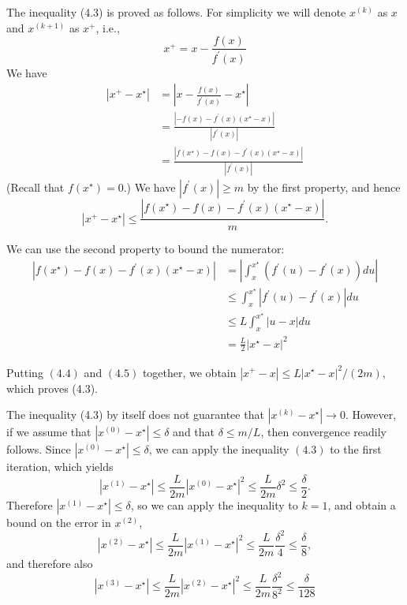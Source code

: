 The inequality (4.3) is proved as follows. For simplicity we will denote $ x^{(k)} $ as $ x $ and $ x^{(k+1)} $ as $ x^{+} $, i.e.,
$$
x^{+}=x-\frac{f(x)}{f^{\prime}(x)}
$$
We have
$$
\begin{aligned}
\left|x^{+}-x^{\star}\right| &=\left|x-\frac{f(x)}{f^{\prime}(x)}-x^{\star}\right| \\
&=\frac{\left|-f(x)-f^{\prime}(x)\left(x^{\star}-x\right)\right|}{\left|f^{\prime}(x)\right|} \\
&=\frac{\left|f\left(x^{\star}\right)-f(x)-f^{\prime}(x)\left(x^{\star}-x\right)\right|}{\left|f^{\prime}(x)\right|}
\end{aligned}
$$
(Recall that $ f\left(x^{\star}\right)=0 $.) We have $ \left|f^{\prime}(x)\right| \geq m $ by the first property, and hence
$$
\left|x^{+}-x^{\star}\right| \leq \frac{\left|f\left(x^{\star}\right)-f(x)-f^{\prime}(x)\left(x^{\star}-x\right)\right|}{m} .
$$

We can use the second property to bound the numerator:
$$
\begin{aligned}
\left|f\left(x^{\star}\right)-f(x)-f^{\prime}(x)\left(x^{\star}-x\right)\right| &=\left|\int_{x}^{x^{\star}}\left(f^{\prime}(u)-f^{\prime}(x)\right) d u\right| \\
& \leq \int_{x}^{x^{\star}}\left|f^{\prime}(u)-f^{\prime}(x)\right| d u \\
& \leq L \int_{x}^{x^{\star}}|u-x| d u \\
&=\frac{L}{2}\left|x^{\star}-x\right|^{2}
\end{aligned}
$$

Putting $ (4.4) $ and $ (4.5) $ together, we obtain $ \left|x^{+}-x\right| \leq L\left|x^{\star}-x\right|^{2} /(2 m) $, which proves (4.3).

The inequality (4.3) by itself does not guarantee that $ \left|x^{(k)}-x^{\star}\right| \rightarrow 0 $. However, if we assume that $ \left|x^{(0)}-x^{\star}\right| \leq \delta $ and that $ \delta \leq m / L $, then convergence readily follows. Since $ \left|x^{(0)}-x^{\star}\right| \leq \delta $, we can apply the inequality $ (4.3) $ to the first iteration, which yields
$$
\left|x^{(1)}-x^{\star}\right| \leq \frac{L}{2 m}\left|x^{(0)}-x^{\star}\right|^{2} \leq \frac{L}{2 m} \delta^{2} \leq \frac{\delta}{2} .
$$
Therefore $ \left|x^{(1)}-x^{\star}\right| \leq \delta $, so we can apply the inequality to $ k=1 $, and obtain a bound on the error in $ x^{(2)} $,
$$
\left|x^{(2)}-x^{\star}\right| \leq \frac{L}{2 m}\left|x^{(1)}-x^{\star}\right|^{2} \leq \frac{L}{2 m} \frac{\delta^{2}}{4} \leq \frac{\delta}{8},
$$
and therefore also
$$
\left|x^{(3)}-x^{\star}\right| \leq \frac{L}{2 m}\left|x^{(2)}-x^{\star}\right|^{2} \leq \frac{L}{2 m} \frac{\delta^{2}}{8^{2}} \leq \frac{\delta}{128}
$$

